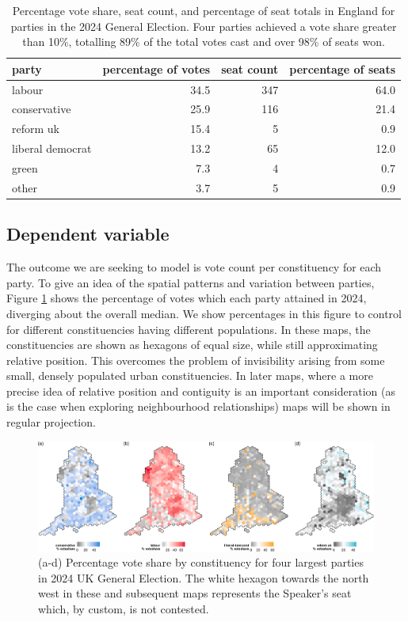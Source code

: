 \documentclass[webpdf,large,contemporary,namedate]{oup-authoring-template}
\theoremstyle{thmstyleone}
\theoremstyle{thmstyletwo}
\theoremstyle{thmstylethree}
\begin{document}
\begin{table}

\caption{\label{tab:elecsummary}Percentage vote share, seat count, and percentage of seat totals in England for parties in the 2024 General Election. Four parties achieved a vote share greater than 10\%, totalling 89\% of the total votes cast and over 98\% of seats won.}
\centering
\fontsize{8}{10}\selectfont
\begin{tabular}[t]{l|r|r|r}
\hline
party & percentage of votes & seat count & percentage of seats\\
\hline
labour & 34.5 & 347 & 64.0\\
\hline
conservative & 25.9 & 116 & 21.4\\
\hline
reform uk & 15.4 & 5 & 0.9\\
\hline
liberal democrat & 13.2 & 65 & 12.0\\
\hline
green & 7.3 & 4 & 0.7\\
\hline
other & 3.7 & 5 & 0.9\\
\hline
\end{tabular}
\end{table}

\subsection{Dependent variable}\label{dependent-variable}

The outcome we are seeking to model is vote count per constituency for
each party. To give an idea of the spatial patterns and variation
between parties, Figure \ref{fig:figvoteshare} shows the percentage of
votes which each party attained in 2024, diverging about the overall
median. We show percentages in this figure to control for different
constituencies having different populations. In these maps, the
constituencies are shown as hexagons of equal size, while still
approximating relative position. This overcomes the problem of
invisibility arising from some small, densely populated urban
constituencies. In later maps, where a more precise idea of relative
position and contiguity is an important consideration (as is the case
when exploring neighbourhood relationships) maps will be shown in
regular projection.

\begin{figure}[th]
\includegraphics[width=1\linewidth]{jrss_resubmission_files/figure-latex/figvoteshare-1} \caption{(a-d) Percentage vote share by constituency for four largest parties in 2024 UK General Election. The white hexagon towards the north west in these and subsequent maps represents the Speaker's seat which, by custom, is not contested.}\label{fig:figvoteshare}
\end{figure}
\end{document}
